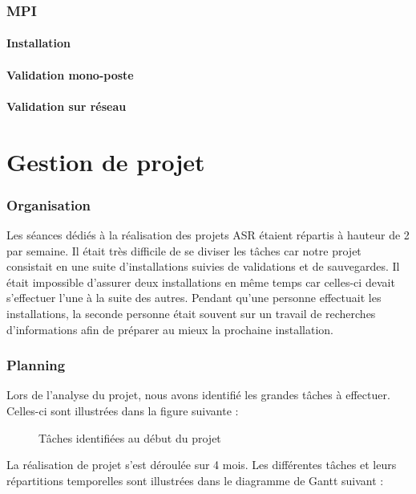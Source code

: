 \documentclass[final]{polytech/polytech}
\begin{document}
\section{MPI}

\subsection{Installation}

\subsection{Validation mono-poste}

\subsection{Validation sur réseau}

\part{Gestion de projet}

\section{Organisation}
Les séances dédiés à la réalisation des projets ASR étaient répartis à hauteur de 2 par semaine. Il était très difficile de se diviser les tâches car notre projet consistait en une suite d'installations suivies de validations et de sauvegardes. Il était impossible d'assurer deux installations en même temps car celles-ci devait s'effectuer l'une à la suite des autres. Pendant qu'une personne effectuait les installations, la seconde personne était souvent sur un travail de recherches d'informations afin de préparer au mieux la prochaine installation.

\section{Planning}
Lors de l'analyse du projet, nous avons identifié les grandes tâches à effectuer. Celles-ci sont illustrées dans la figure suivante :

\begin{figure}
	\caption{Tâches identifiées au début du projet}
	\label{fig:tasks}
\end{figure}

\vfill\eject

La réalisation de projet s'est déroulée sur 4 mois. Les différentes tâches et leurs répartitions temporelles sont illustrées dans le diagramme de Gantt suivant :
\end{document}
